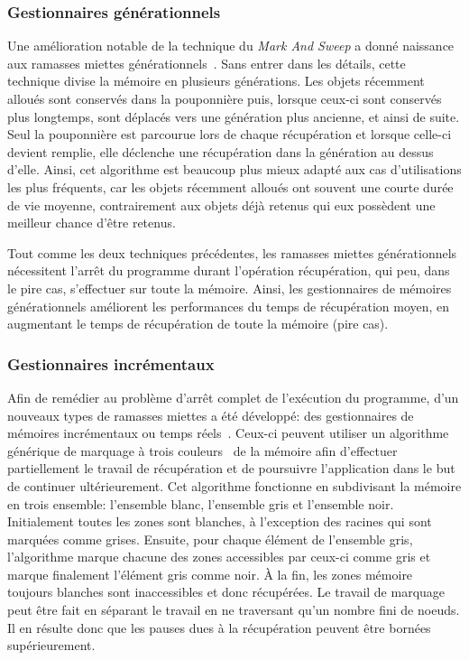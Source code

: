 \documentclass[12pt,twoside,letterpaper,francais]{book}
\begin{document}
\FloatBarrier
\subsubsection{Gestionnaires générationnels}
Une amélioration notable de la technique du \textit{Mark And Sweep} a
donné naissance aux ramasses miettes
générationnels~\cite{GEN_GC}. Sans entrer dans les détails, cette
technique divise la mémoire en plusieurs générations. Les objets
récemment alloués sont conservés dans la pouponnière puis, lorsque
ceux-ci sont conservés plus longtemps, sont déplacés vers une
génération plus ancienne, et ainsi de suite. Seul la pouponnière est
parcourue lors de chaque récupération et lorsque celle-ci devient
remplie, elle déclenche une récupération dans la génération au dessus
d'elle. Ainsi, cet algorithme est beaucoup plus mieux adapté aux cas
d'utilisations les plus fréquents, car les objets récemment alloués
ont souvent une courte durée de vie moyenne, contrairement aux objets
déjà retenus qui eux possèdent une meilleur chance d'être
retenus. 

Tout comme les deux techniques précédentes, les ramasses miettes
générationnels nécessitent l'arrêt du programme durant l'opération
récupération, qui peu, dans le pire cas, s'effectuer sur toute la
mémoire. Ainsi, les gestionnaires de mémoires générationnels
améliorent les performances du temps de récupération moyen, en
augmentant le temps de récupération de toute la mémoire (pire cas).


\FloatBarrier
\subsubsection{Gestionnaires incrémentaux}
Afin de remédier au problème d'arrêt complet de l'exécution du
programme, d'un nouveaux types de ramasses miettes a été développé:
des gestionnaires de mémoires incrémentaux ou temps
réels~\cite{INCR_BAKER}. Ceux-ci peuvent utiliser un algorithme
générique de marquage à trois couleurs~\cite{dijkstra-tricolour} de la
mémoire afin d'effectuer partiellement le travail de récupération et
de poursuivre l'application dans le but de continuer
ultérieurement. Cet algorithme fonctionne en subdivisant la mémoire en
trois ensemble: l'ensemble blanc, l'ensemble gris et l'ensemble
noir. Initialement toutes les zones sont blanches, à l'exception des
racines qui sont marquées comme grises. Ensuite, pour chaque élément
de l'ensemble gris, l'algorithme marque chacune des zones accessibles
par ceux-ci comme gris et marque finalement l'élément gris comme
noir. À la fin, les zones mémoire toujours blanches sont inaccessibles
et donc récupérées.  Le travail de marquage peut être fait en séparant
le travail en ne traversant qu'un nombre fini de noeuds. Il en résulte
donc que les pauses dues à la récupération peuvent être bornées
supérieurement.
\end{document}
